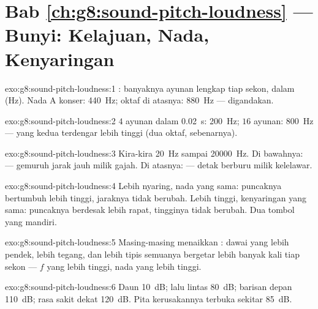 \section*{Bab \ref{ch:g8:sound-pitch-loudness} --- Bunyi: Kelajuan, Nada, Kenyaringan}

\begin{solution}{exo:g8:sound-pitch-loudness:1}
: banyaknya ayunan lengkap tiap sekon, dalam 
(\unit{Hz}). Nada A konser: \qty{440}{Hz}; oktaf di atasnya:
\qty{880}{Hz} --- digandakan.
\end{solution}

\begin{solution}{exo:g8:sound-pitch-loudness:2}
$4$ ayunan dalam \qty{0.02}{s}: \qty{200}{Hz}; $16$ ayunan:
\qty{800}{Hz} --- yang kedua terdengar lebih tinggi (dua oktaf,
sebenarnya).
\end{solution}

\begin{solution}{exo:g8:sound-pitch-loudness:3}
Kira-kira \qty{20}{Hz} sampai \qty{20000}{Hz}. Di bawahnya:
 --- gemuruh jarak jauh milik gajah. Di atasnya: 
--- detak berburu milik kelelawar.
\end{solution}

\begin{solution}{exo:g8:sound-pitch-loudness:4}
Lebih nyaring, nada yang sama: puncaknya bertumbuh lebih tinggi,
jaraknya tidak berubah. Lebih tinggi, kenyaringan yang sama: puncaknya
berdesak lebih rapat, tingginya tidak berubah. Dua tombol yang mandiri.
\end{solution}

\begin{solution}{exo:g8:sound-pitch-loudness:5}
Masing-masing menaikkan : dawai yang lebih pendek, lebih
tegang, dan lebih tipis semuanya bergetar lebih banyak kali tiap sekon
--- $f$ yang lebih tinggi, nada yang lebih tinggi.
\end{solution}

\begin{solution}{exo:g8:sound-pitch-loudness:6}
Daun \qty{10}{dB}; lalu lintas \qty{80}{dB}; barisan depan
\qty{110}{dB}; rasa sakit dekat \qty{120}{dB}. Pita kerusakannya
terbuka sekitar \qty{85}{dB}.
\end{solution}

